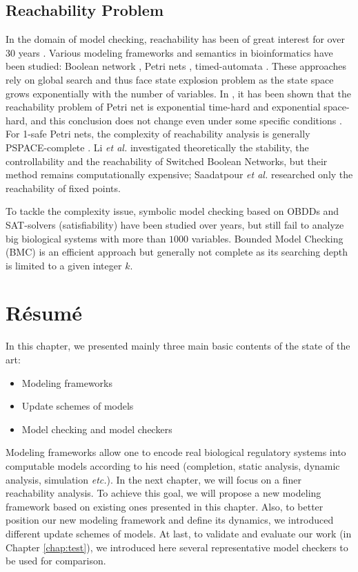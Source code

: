 \subsection{Reachability Problem}
In the domain of model checking, reachability has been of great interest for over 30 years \cite{clarke2008birth,clarke20142}. 
Various modeling frameworks and semantics in bioinformatics have been studied: Boolean network \cite{akutsu2007control}, Petri nets \cite{mayr1984,esparza1998}, timed-automata \cite{Daws1998,wozna2003}. 
These approaches rely on global search and thus face state explosion problem as the state space grows exponentially with the number of variables. 
In \cite{peterson1977petri}, it has been shown that the reachability problem of Petri net is exponential time-hard and exponential space-hard, and this conclusion does not change even under some specific conditions \cite{esparza1998}. 
For 1-safe Petri nets, the complexity of reachability analysis is generally PSPACE-complete \cite{cheng1995complexity}.
Li \textit{et al.} \cite{li2012reachability,li2014stability} investigated theoretically the stability, the controllability and the reachability of Switched Boolean Networks, but their method remains computationally expensive;
Saadatpour \textit{et al.} \cite{saadatpour2010attractor} researched only the reachability of fixed points.

To tackle the complexity issue, symbolic model checking \cite{burch1992symbolic} based on OBDDs and SAT-solvers (satisfiability) \cite{abdulla2000symbolic} have been studied over years, but still fail to analyze big biological systems with more than $1000$ variables. 
Bounded Model Checking (BMC) \cite{clarke2001bounded} is an efficient approach but generally not complete as its searching depth is limited to a given integer $k$.


\section{R\'esum\'e}
In this chapter, we presented mainly three main basic contents of the state of the art:

\begin{itemize}
    \item Modeling frameworks
    \item Update schemes of models
    \item Model checking and model checkers
\end{itemize}

Modeling frameworks allow one to encode real biological regulatory systems into computable models according to his need (completion, static analysis, dynamic analysis, simulation \textit{etc.}).
In the next chapter, we will focus on a finer reachability analysis.
To achieve this goal, we will propose a new modeling framework based on existing ones presented in this chapter.
Also, to better position our new modeling framework and define its dynamics, we introduced different update schemes of models.
At last, to validate and evaluate our work (in Chapter \ref{chap:test}), we introduced here several representative model checkers to be used for comparison.